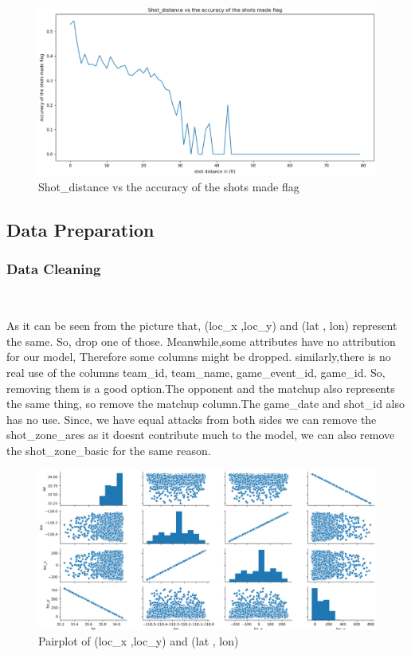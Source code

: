 \begin{figure}[H]
	\centering
	\includegraphics[scale=0.2]{s.eps
	}        %
	\caption{Shot_distance vs the accuracy of the shots made flag}
	\label{fig6}
\end{figure}


\subsection{Data Preparation}

\subsubsection{Data Cleaning}
\

As it can be seen from 
the picture that, (loc_x ,loc_y) and (lat , lon) represent the same.
So, drop one of those.
Meanwhile,some attributes have no attribution for our model,
Therefore some columns might be dropped.
similarly,there is no real use of the columns team_id, team_name, game_event_id, game_id.
So, removing them is a good option.The opponent and the matchup also represents the same thing, 
so remove the matchup column.The game_date and shot_id also has no use.
Since, we have equal attacks from both sides we can remove the shot_zone_ares as it
doesnt contribute much to the model, we can also remove the shot_zone_basic for the same reason.


\begin{figure}[H]
	\centering
	\includegraphics[scale=0.25]{t.eps
	}        %
	\caption{Pairplot of (loc\_x ,loc\_y) and (lat , lon)}
	\label{fig7}
\end{figure}


